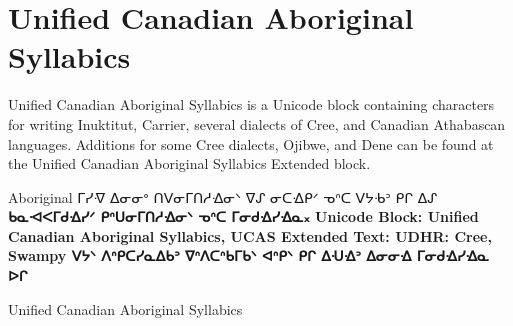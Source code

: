 \section{Unified Canadian Aboriginal Syllabics}

Unified Canadian Aboriginal Syllabics is a Unicode block containing characters for writing Inuktitut, Carrier, several dialects of Cree, and Canadian Athabascan languages. Additions for some Cree dialects, Ojibwe, and Dene can be found at the Unified Canadian Aboriginal Syllabics Extended block.
\medskip

\newfontfamily{}

\begin{scriptexample}[]{Aboriginal}
\bgroup
\aboriginal
ᒥᓯᐌ ᐃᓂᓂᐤ ᑎᐯᓂᒥᑎᓱᐎᓂᐠ ᐁᔑ ᓂᑕᐎᑭᐟ ᓀᐢᑕ ᐯᔭᑾᐣ ᑭᒋ ᐃᔑ
\bfseries ᑲᓇᐗᐸᒥᑯᐎᓯᐟ ᑭᐢᑌᓂᒥᑎᓱᐎᓂᐠ ᓀᐢᑕ ᒥᓂᑯᐎᓯᐎᓇ᙮
Unicode Block: Unified Canadian Aboriginal Syllabics, UCAS Extended
Text: UDHR: Cree, Swampy ᐯᔭᐠ ᐱᐢᑭᑕᓯᓇᐃᑲᐣ ᐁᐢᐱᑕᐢᑲᒥᑲᐠ ᐊᐢᑭᐠ ᑭᒋ ᐃᑗᐎᐣ ᐃᓂᓂᐎ ᒥᓂᑯᐎᓯᐎᓇ ᐅᒋ
\egroup
\end{scriptexample}

\begin{scriptexample}[]{Unified Canadian Aboriginal Syllabics }
\end{scriptexample}